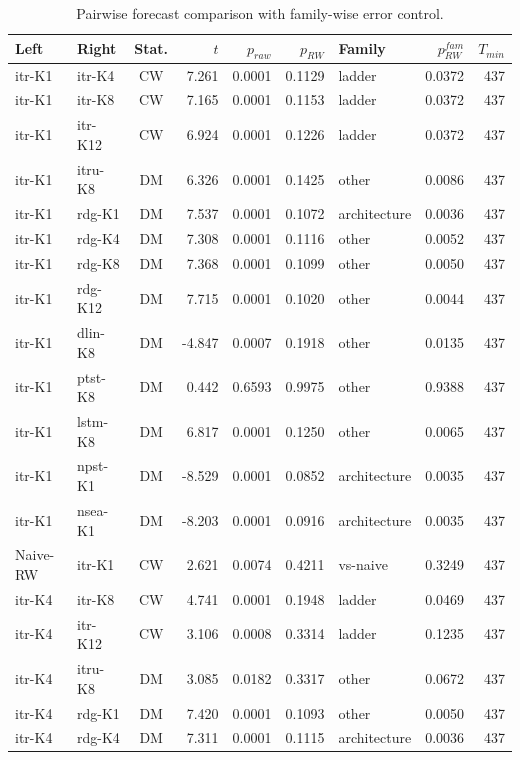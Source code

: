 \begin{table}[!t]
\centering
\caption{Pairwise forecast comparison with family-wise error control.}
\label{tab:dm}
\begin{tabular}{llcrrrlrr}
\toprule
Left & Right & Stat. & $t$ & $p_{raw}$ & $p_{RW}$ & Family & $p_{RW}^{fam}$ & $T_{min}$ \\
\midrule
itr-K1 & itr-K4 & CW & 7.261 & 0.0001 & 0.1129 & ladder & 0.0372 & 437 \\
itr-K1 & itr-K8 & CW & 7.165 & 0.0001 & 0.1153 & ladder & 0.0372 & 437 \\
itr-K1 & itr-K12 & CW & 6.924 & 0.0001 & 0.1226 & ladder & 0.0372 & 437 \\
itr-K1 & itru-K8 & DM & 6.326 & 0.0001 & 0.1425 & other & 0.0086 & 437 \\
itr-K1 & rdg-K1 & DM & 7.537 & 0.0001 & 0.1072 & architecture & 0.0036 & 437 \\
itr-K1 & rdg-K4 & DM & 7.308 & 0.0001 & 0.1116 & other & 0.0052 & 437 \\
itr-K1 & rdg-K8 & DM & 7.368 & 0.0001 & 0.1099 & other & 0.0050 & 437 \\
itr-K1 & rdg-K12 & DM & 7.715 & 0.0001 & 0.1020 & other & 0.0044 & 437 \\
itr-K1 & dlin-K8 & DM & -4.847 & 0.0007 & 0.1918 & other & 0.0135 & 437 \\
itr-K1 & ptst-K8 & DM & 0.442 & 0.6593 & 0.9975 & other & 0.9388 & 437 \\
itr-K1 & lstm-K8 & DM & 6.817 & 0.0001 & 0.1250 & other & 0.0065 & 437 \\
itr-K1 & npst-K1 & DM & -8.529 & 0.0001 & 0.0852 & architecture & 0.0035 & 437 \\
itr-K1 & nsea-K1 & DM & -8.203 & 0.0001 & 0.0916 & architecture & 0.0035 & 437 \\
Naive-RW & itr-K1 & CW & 2.621 & 0.0074 & 0.4211 & vs-naive & 0.3249 & 437 \\
itr-K4 & itr-K8 & CW & 4.741 & 0.0001 & 0.1948 & ladder & 0.0469 & 437 \\
itr-K4 & itr-K12 & CW & 3.106 & 0.0008 & 0.3314 & ladder & 0.1235 & 437 \\
itr-K4 & itru-K8 & DM & 3.085 & 0.0182 & 0.3317 & other & 0.0672 & 437 \\
itr-K4 & rdg-K1 & DM & 7.420 & 0.0001 & 0.1093 & other & 0.0050 & 437 \\
itr-K4 & rdg-K4 & DM & 7.311 & 0.0001 & 0.1115 & architecture & 0.0036 & 437 \\

\end{tabular}
\end{table}
